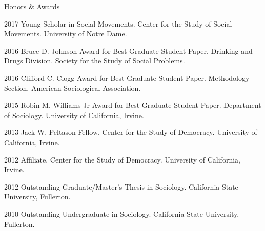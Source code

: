 
\begin{rSection}{Honors \& Awards}

\begin{hangt}{2017 \datefill}
Young Scholar in Social Movements. Center for the Study of Social Movements. University of Notre Dame.
\end{hangt}
\begin{hangt}{2016 \datefill}
Bruce D. Johnson Award for Best Graduate Student Paper. Drinking and Drugs Division. Society for the Study of Social Problems.
\end{hangt}
\begin{hangt}{2016 \datefill}
Clifford C. Clogg Award for Best Graduate Student Paper. Methodology Section. American Sociological Association.
\end{hangt}
\begin{hangt}{2015 \datefill}
Robin M. Williams Jr Award for Best Graduate Student Paper. Department of Sociology. University of California, Irvine.
\end{hangt}
\begin{hangt}{2013 \datefill}
Jack W. Peltason Fellow. Center for the Study of Democracy. University of California, Irvine.
\end{hangt}
\begin{hangt}{2012 \datefill}
Affiliate. Center for the Study of Democracy. University of California, Irvine.
\end{hangt}
\begin{hangt}{2012 \datefill}
Outstanding Graduate/Master's Thesis in Sociology. California State University, Fullerton.
\end{hangt}
\begin{hangt}{2010 \datefill}
Outstanding Undergraduate in Sociology. California State University, Fullerton.
\end{hangt}

\end{rSection}





